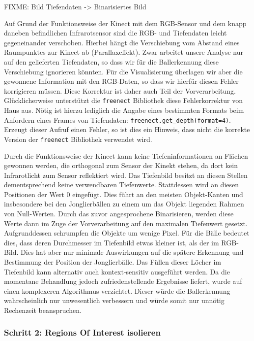 \documentclass[12pt,a4paper,ngerman]{scrartcl}
\begin{document}
{\color{red}FIXME: Bild Tiefendaten -> Binarisiertes Bild}

Auf Grund der Funktionsweise der Kinect mit dem RGB-Sensor und dem knapp daneben
befindlichen Infrarotsensor sind die RGB- und Tiefendaten leicht gegeneinander
verschoben. Hierbei hängt die Verschiebung vom Abstand eines Raumpunktes zur Kinect
ab (Parallaxeffekt). Zwar arbeitet unsere Analyse nur auf den gelieferten
Tiefendaten, so dass wir für die Ballerkennung diese Verschiebung ignorieren
könnten. Für die Visualisierung überlagen wir aber die gewonnene Information mit
den RGB-Daten, so dass wir hierfür diesen Fehler korrigieren müssen. Diese
Korrektur ist daher auch Teil der Vorverarbeitung. Glücklicherweise unterstützt
die \lstinline{freenect} Bibliothek diese Fehlerkorrektur von Haus aus. Nötig
ist hierzu lediglich die Angabe eines bestimmten Formats beim Anfordern eines
Frames von Tiefendaten: \lstinline{freenect.get_depth(format=4)}.
Erzeugt dieser Aufruf einen Fehler, so ist dies ein Hinweis, dass nicht die korrekte
Version der \lstinline{freenect} Bibliothek verwendet wird.

Durch die Funktionsweise der Kinect kann keine Tiefeninformationen an Flächen gewonnen werden, die orthogonal zum Sensor der Kinekt stehen, da dort kein Infrarotlicht zum Sensor reflektiert wird.
Das Tiefenbild besitzt an diesen Stellen dementsprechend keine verwendbaren Tiefenwerte. Stattdessen wird an diesen Positionen der Wert 0 eingefügt. Dies führt an den meisten Objekt-Kanten und insbesondere bei den Jonglierbällen zu einem um das Objekt liegenden Rahmen von Null-Werten. Durch das zuvor angesprochene Binarisieren, werden diese Werte dann im Zuge der Vorverarbeitung auf den maximalen Tiefenwert gesetzt. Aufgrunddessen schrumpfen die Objekte um wenige Pixel. Für die Bälle bedeutet dies, dass deren Durchmesser im Tiefenbild etwas kleiner ist, als der im RGB-Bild. Dies hat aber nur minimale Auswirkungen auf die spätere Erkennung und Bestimmung der Position der Jonglierbälle.
Das Füllen dieser Löcher im Tiefenbild kann alternativ auch kontext-sensitiv ausgeführt werden. Da die momentane Behandlung jedoch zufriedenstellende Ergebnisse liefert, wurde auf einen komplexeren Algorithmus verzichtet. Dieser würde die Ballerkennung wahrscheinlich nur unwesentlich verbessern und würde somit nur unnötig Rechenzeit beanspruchen.

\subsubsection{Schritt 2: Regions Of Interest isolieren}
\label{sec:roi}
\end{document}
